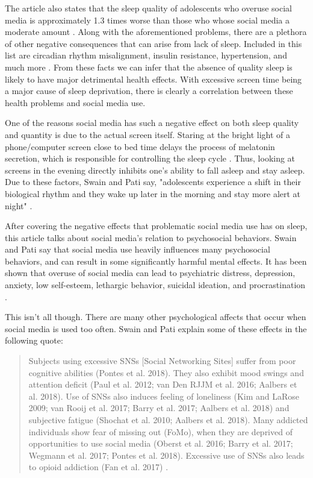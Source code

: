 \documentclass[12pt, journal, compsoc]{IEEEtran}
\begin{document}
The article also states that the sleep quality of adolescents who overuse social media is approximately 1.3 times worse than those who whose social media a moderate amount \cite{Repercussions}. Along with the aforementioned problems, there are a plethora of other negative consequences that can arise from lack of sleep. Included in this list are circadian rhythm misalignment, insulin resistance, hypertension, and much more \cite{Repercussions}. From these facts we can infer that the absence of quality sleep is likely to have major detrimental health effects. With excessive screen time being a major cause of sleep deprivation, there is clearly a correlation between these health problems and social media use. 

One of the reasons social media has such a negative effect on both sleep quality and quantity is due to the actual screen itself. Staring at the bright light of a phone/computer screen close to bed time delays the process of melatonin secretion, which is responsible for controlling the sleep cycle \cite{Repercussions}. Thus, looking at screens in the evening directly inhibits one's ability to fall asleep and stay asleep. Due to these factors, Swain and Pati say, "adolescents experience a shift in their biological rhythm and they wake up later in the morning and stay more alert at night" \cite{ProblematicUse}. 



After covering the negative effects that problematic social media use has on sleep, this article talks about social media's relation to psychosocial behaviors. Swain and Pati say that social media use heavily influences many psychosocial behaviors, and can result in some significantly harmful mental effects. It has been shown that overuse of social media can lead to psychiatric distress, depression, anxiety, low self-esteem, lethargic behavior, suicidal ideation, and procrastination \cite{Repercussions}.

This isn't all though. There are many other psychological affects that occur when social media is used too often. Swain and Pati explain some of these effects in the following quote:
\begin{quote}
    Subjects using excessive SNSs [Social Networking Sites] suffer from poor cognitive abilities (Pontes et al. 2018). They also exhibit mood swings and attention deficit (Paul et al. 2012; van Den RJJM et al. 2016; Aalbers et al. 2018). Use of SNSs also induces feeling of loneliness (Kim and LaRose 2009; van Rooij et al. 2017; Barry et al. 2017; Aalbers et al. 2018) and subjective fatigue (Shochat et al. 2010; Aalbers et al. 2018). Many addicted individuals show fear of missing out (FoMo), when they are deprived of  opportunities to use social media (Oberst et al. 2016; Barry et al. 2017; Wegmann et al. 2017; Pontes et al. 2018). Excessive use of SNSs also leads to opioid addiction (Fan et al. 2017) \cite{Repercussions}.
\end{quote}
\end{document}
